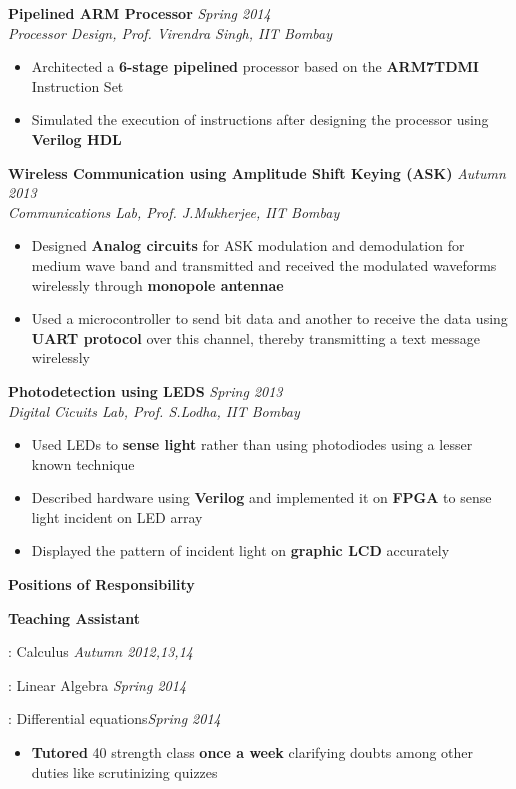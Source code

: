 \documentclass[a4paper,10pt]{article}
\newcommand{\resheading}[1]{
	{\large \colorbox{mygrey}{\begin{minipage}{\textwidth}{\textbf{#1 \vphantom{p\^{E}}}}\end{minipage}}}
}
\newcommand{\ressubheadingWithGuide}[3]{%

	\textbf{#1} \hfill \textit{#2}\null\\
	\textit{\small #3} %
	\vspace{-4pt}
}
\newcommand{\ressubheadingother}[2]{
	\textbf{#1} \hfill \textit{#2}\null
	\vspace{-4pt}
}
\begin{document}
	\ressubheadingWithGuide{Pipelined ARM Processor}{Spring 2014}{Processor Design, Prof. Virendra Singh, IIT Bombay}
    	\begin{itemize}\itemsep -1pt
	    	\item Architected a \textbf{6-stage pipelined} processor based on the \textbf{ARM7TDMI} Instruction Set
			\item Simulated the execution of instructions after designing the processor using \textbf{Verilog HDL}
		\end{itemize}


	\ressubheadingWithGuide{Wireless Communication using Amplitude Shift Keying (ASK)}{Autumn 2013}{Communications Lab, Prof. J.Mukherjee, IIT Bombay}
    	\begin{itemize}\itemsep -1pt
	        \item Designed \textbf{Analog circuits} for ASK modulation and demodulation for medium wave band and transmitted and received the modulated waveforms wirelessly through  \textbf{monopole antennae}
	        \item Used a microcontroller to send bit data and another to receive the data using \textbf{UART protocol} over this channel, thereby transmitting a text message wirelessly
        \end{itemize}

	\ressubheadingWithGuide{Photodetection using LEDS}{\textit{Spring 2013}}{Digital Cicuits Lab, Prof. S.Lodha, IIT Bombay}
		\begin{itemize}\itemsep -1pt
			\item Used LEDs to \textbf{sense light} rather than using photodiodes using a lesser known technique
			\item Described hardware using \textbf{Verilog} and implemented it on \textbf{FPGA} to sense light incident on LED array
			\item Displayed the pattern of incident light on \textbf{graphic LCD} accurately
		\end{itemize}

\resheading{Positions of Responsibility}

	\ressubheadingother{Teaching Assistant}{}

	\begin{description} [labelindent=*] \itemsep -1pt
		\item[MA 105]: Calculus \hfill \textit{Autumn 2012,13,14}
		\item[MA 106]: Linear Algebra \hfill \textit{Spring 2014}
		\item[MA 108]: Differential equations\hfill \textit{Spring 2014}
	\end{description}
	\vspace{-15pt}
	\begin{itemize}
		\item \textbf{Tutored} 40 strength class \textbf{once a week} clarifying doubts among other duties like scrutinizing quizzes
	\end{itemize}
\end{document}
